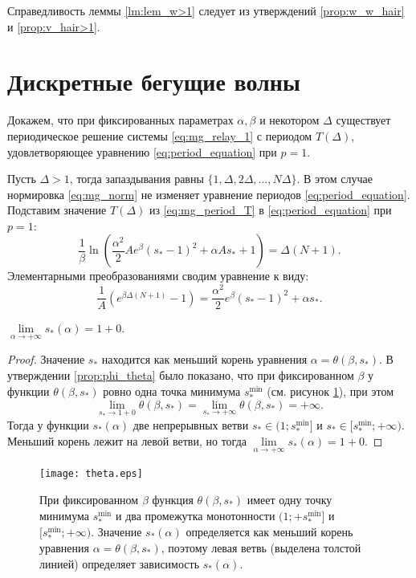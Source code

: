 Справедливость леммы \ref{lm:lem_w>1} следует из утверждений \ref{prop:w_w_hair} и \ref{prop:v_hair>1}.

\section{Дискретные бегущие волны}\label{sec:ch2/sect3}

Докажем, что при фиксированных параметрах $\alpha, \beta$ и некотором $\Delta$ существует периодическое решение системы \eqref{eq:mg_relay_1} с периодом $T(\Delta)$, удовлетворяющее уравнению \eqref{eq:period_equation} при $p = 1$.

Пусть $\Delta > 1$, тогда запаздывания равны $\{1, \Delta, 2\Delta, \ldots, N\Delta\}$. В этом случае нормировка \eqref{eq:mg_norm} не изменяет уравнение периодов \eqref{eq:period_equation}.  Подставим значение $T(\Delta)$ из \eqref{eq:mg_period_T} в \eqref{eq:period_equation} при $p = 1$:
%
\begin{equation}
	\label{eq:period_eq}
	\dfrac{1}{\beta}\ln\left( \frac{\alpha^2}{2}Ae^{\beta}( s_*-1)^2+\alpha A s_* + 1\right) = \Delta (N + 1).
\end{equation}
%
Элементарными преобразованиями сводим уравнение к виду:
\begin{equation}
	\label{eq:period_eq_exp}
	\dfrac{1}{A}\left(e^{\beta\Delta(N + 1)} - 1\right) = \dfrac{\alpha^2}{2}e^{\beta}( s_* - 1)^2 + \alpha s_*.
\end{equation}

\begin{proposition}
	$\lim\limits_{\alpha\to+\infty} s_*(\alpha) = 1 + 0$.
\end{proposition}
\begin{proof}
	Значение $s_*$ находится как меньший корень уравнения $\alpha = \theta(\beta, s_*)$. В утверждении \ref{prop:phi_theta} было показано, что при фиксированном $\beta$ у функции $\theta(\beta,  s_*)$ ровно одна точка минимума $ s_*^{\text{min}}$ (см. рисунок \ref{fig:theta_func_min}), при этом
	\begin{equation}
		\lim\limits_{s_* \to 1+0} \theta(\beta, s_*) = \lim\limits_{s_*\to +\infty} \theta(\beta,  s_*) = +\infty.
	\end{equation}
	Тогда у функции $s_*(\alpha)$ две непрерывных ветви $s_* \in (1;  s_*^{\text{min}}]$ и $ s_* \in [ s_*^{\text{min}}; +\infty)$. Меньший корень лежит на левой ветви, но тогда $\lim\limits_{\alpha\to+\infty} s_*(\alpha)= 1 + 0$.
\end{proof}
%
\begin{figure}
	\centering
	\texttt{[image: theta.eps]}
	\caption{При фиксированном $\beta$ функция $\theta(\beta,  s_*)$ имеет одну точку минимума $ s_*^{\min}$ и два промежутка монотонности $(1; + s_*^{\min}]$ и $[ s_*^{\min}; +\infty)$. Значение $ s_*(\alpha)$ определяется как меньший корень уравнения $\alpha = \theta(\beta,  s_*)$, поэтому левая ветвь (выделена толстой линией) определяет зависимость $ s_*(\alpha)$.}
	\label{fig:theta_func_min}
\end{figure}


